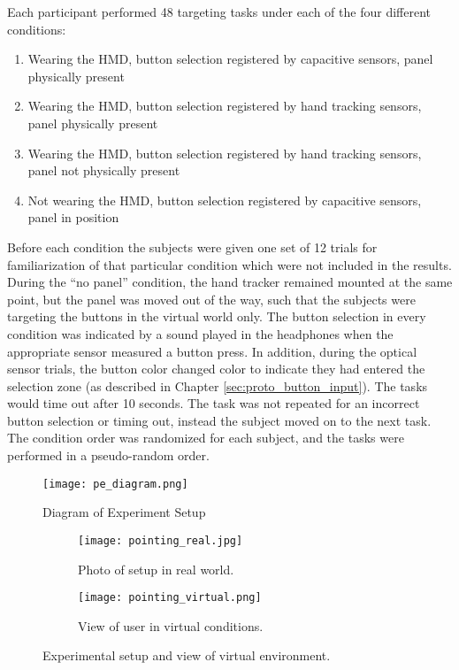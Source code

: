 Each participant performed 48 targeting tasks under each of the four different conditions:
\begin{enumerate}
    \item Wearing the HMD, button selection registered by capacitive sensors, panel physically present
    \item Wearing the HMD, button selection registered by hand tracking sensors, panel physically present
    \item Wearing the HMD, button selection registered by hand tracking sensors, panel not physically present
    \item Not wearing the HMD, button selection registered by capacitive sensors, panel in position
\end{enumerate}
Before each condition the subjects were given one set of 12 trials for familiarization of that particular condition which were not included in the results.
During the ``no panel'' condition, the hand tracker remained mounted at the same point, but the panel was moved out of the way, such that the subjects were targeting the buttons in the virtual world only.
The button selection in every condition was indicated by a sound played in the headphones when the appropriate sensor measured a button press.
In addition, during the optical sensor trials, the button color changed color to indicate they had entered the selection zone (as described in Chapter \ref{sec:proto_button_input}).
The tasks would time out after 10 seconds.
The task was not repeated for an incorrect button selection or timing out, instead the subject moved on to the next task.
The condition order was randomized for each subject, and the tasks were performed in a pseudo-random order.

\begin{figure}
    \centering
    \texttt{[image: pe\_diagram.png]}
    \caption{Diagram of Experiment Setup}
    \label{fig:pe_diagram}
\end{figure}

\begin{figure}
    \centering
    \begin{subfigure}[t]{0.49\linewidth}
        \centering
        \texttt{[image: pointing\_real.jpg]}
        \caption{Photo of setup in real world.}
        \label{fig:p_setup:real}
    \end{subfigure}
    \begin{subfigure}[t]{0.49\linewidth}
        \centering
        \texttt{[image: pointing\_virtual.png]}
        \caption{View of user in virtual conditions.}
        \label{fig:p_setup:virtual}
    \end{subfigure}
    \caption{Experimental setup and view of virtual environment.}
    \label{fig:p_setup}
\end{figure}


